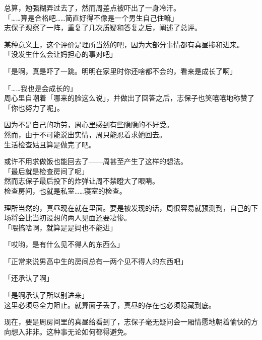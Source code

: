 总算，勉强糊弄过去了，然而周差点被吓出了一身冷汗。\\

「……算是合格吧……简直好得不像是一个男生自己住嘛」\\

志保子观察了一阵，重复了几次质疑和答复之后，阐述了总评。

某种意义上，这个评价是理所当然的吧，因为大部分事情都有真昼掺和进来。\\

「没发生什么会让妈担心的事对吧」

「是啊，真是吓了一跳。明明在家里时你还啥都不会的，看来是成长了啊」

「……我也是会成长的」\\

周心里自嘲着「哪来的脸这么说」，并做出了回答之后，志保子也笑嘻嘻地称赞了「你也努力了呢」。

因为不是自己的功劳，周心里感到有些隐隐的不好受。\\

然而，由于不可能说出实情，周只能忍着求她回去。\\

生活检查姑且算是做完了吧。

或许不用求做饭也能回去了——周甚至产生了这样的想法。\\

「最后就是检查房间了呢」\\

然而志保子最后投下的炸弹让周不禁瞪大了眼睛。\\

检查房间，也就是私室……寝室的检查。

理所当然的，真昼现在就在里面。要是被发现的话，周很容易就预测到，自己的下场将会比当初设想的两人见面还要凄惨。\\

「喂搞啥啊，就算是是妈也不能进」

「哎哟，是有什么见不得人的东西么」

「正常来说男高中生的房间总有一两个见不得人的东西吧」

「还承认了啊」

「是啊承认了所以别进来」\\

这里必须尽全力阻止。就算面子丢了，真昼的存在也必须隐藏到底。

现在，要是周房间里的真昼给看到了，志保子毫无疑问会一厢情愿地朝着愉快的方向想入非非。这种事无论如何都得避免。\\

